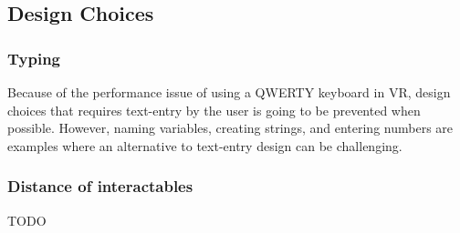 \documentclass{sigchi}
\begin{document}
\subsection{Design Choices}
\subsubsection{Typing}
Because of the performance issue of using a QWERTY keyboard in VR, design choices that requires text-entry by the user is going to be prevented when possible. However, naming variables, creating strings, and entering numbers are examples where an alternative to text-entry design can be challenging.

\subsubsection{Distance of interactables}
TODO



\end{document}
